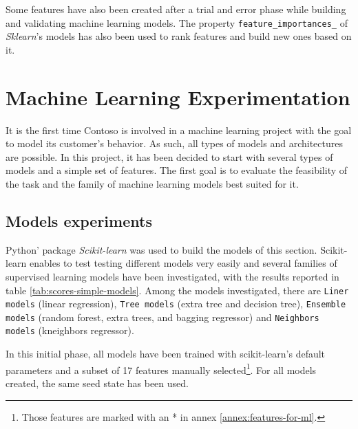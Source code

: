 Some features have also been created after a trial and error phase while building and validating machine learning models. The property \texttt{feature\_importances\_} of \textit{Sklearn}'s models has also been used to rank features and build new ones based on it.



\section{Machine Learning Experimentation} \label{sec:ml-experimentation}

It is the first time Contoso is involved in a machine learning project with the goal to model its customer's behavior. As such, all types of models and architectures are possible. In this project, it has been decided to start with several types of models and a simple set of features. The first goal is to evaluate the feasibility of the task and the family of machine learning models best suited for it. 


\subsection{Models experiments}
Python' package \textit{Scikit-learn} was used to build the models of this section. Scikit-learn enables to test testing different models very easily and several families of supervised learning models have been investigated, with the results reported in table \ref{tab:scores-simple-models}. Among the models investigated, there are \texttt{Liner models} (linear regression), \texttt{Tree models} (extra tree and decision tree), \texttt{Ensemble models} (random forest, extra trees, and bagging regressor) and \texttt{Neighbors models} (kneighbors regressor).

In this initial phase, all models have been trained with scikit-learn's default parameters and a subset of 17 features manually selected\footnote{Those features are marked with an * in annex \ref{annex:features-for-ml}.}. For all models created, the same seed state has been used.

